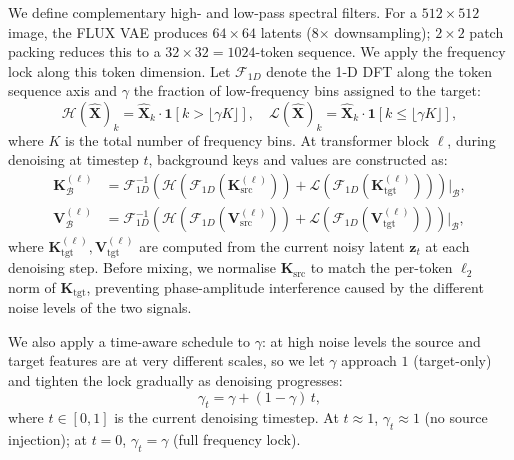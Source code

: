 We define complementary high- and low-pass spectral filters.
For a $512\times512$ image, the FLUX VAE produces $64\times64$ latents (8$\times$
downsampling); $2\times2$ patch packing reduces this to a $32\times32 = 1024$-token sequence.
We apply the frequency lock along this token dimension.
Let $\mathcal{F}_{1D}$ denote the 1-D DFT along the token sequence axis and $\gamma$ the
fraction of low-frequency bins assigned to the target:
\begin{equation}
    \mathcal{H}(\hat{\mathbf{X}})_{k}
        = \hat{\mathbf{X}}_{k} \cdot \mathbf{1}[k > \lfloor\gamma K\rfloor],
    \quad
    \mathcal{L}(\hat{\mathbf{X}})_{k}
        = \hat{\mathbf{X}}_{k} \cdot \mathbf{1}[k \leq \lfloor\gamma K\rfloor],
    \label{eq:filters}
\end{equation}
where $K$ is the total number of frequency bins.
At transformer block $\ell$, during denoising at timestep $t$, background keys and values
are constructed as:
\begin{align}
    \mathbf{K}_{\mathcal{B}}^{(\ell)}
        &= \mathcal{F}_{1D}^{-1}\!\!\left(
              \mathcal{H}\!\left(\mathcal{F}_{1D}(\mathbf{K}_{\mathrm{src}}^{(\ell)})\right)
            + \mathcal{L}\!\left(\mathcal{F}_{1D}(\mathbf{K}_{\mathrm{tgt}}^{(\ell)})\right)
           \right)\bigg|_{\mathcal{B}},
    \label{eq:bg_K} \\
    \mathbf{V}_{\mathcal{B}}^{(\ell)}
        &= \mathcal{F}_{1D}^{-1}\!\!\left(
              \mathcal{H}\!\left(\mathcal{F}_{1D}(\mathbf{V}_{\mathrm{src}}^{(\ell)})\right)
            + \mathcal{L}\!\left(\mathcal{F}_{1D}(\mathbf{V}_{\mathrm{tgt}}^{(\ell)})\right)
           \right)\bigg|_{\mathcal{B}},
    \label{eq:bg_V}
\end{align}
where $\mathbf{K}_{\mathrm{tgt}}^{(\ell)}, \mathbf{V}_{\mathrm{tgt}}^{(\ell)}$ are computed
from the current noisy latent $\mathbf{z}_t$ at each denoising step.
Before mixing, we normalise $\mathbf{K}_{\mathrm{src}}$ to match the per-token
$\ell_2$ norm of $\mathbf{K}_{\mathrm{tgt}}$, preventing phase-amplitude interference
caused by the different noise levels of the two signals.

We also apply a time-aware schedule to $\gamma$: at high noise levels the source and target
features are at very different scales, so we let $\gamma$ approach $1$ (target-only) and
tighten the lock gradually as denoising progresses:
\begin{equation}
    \gamma_t = \gamma + (1 - \gamma)\,t,
    \label{eq:gamma_schedule}
\end{equation}
where $t \in [0, 1]$ is the current denoising timestep.
At $t \approx 1$, $\gamma_t \approx 1$ (no source injection); at $t = 0$, $\gamma_t = \gamma$
(full frequency lock).


